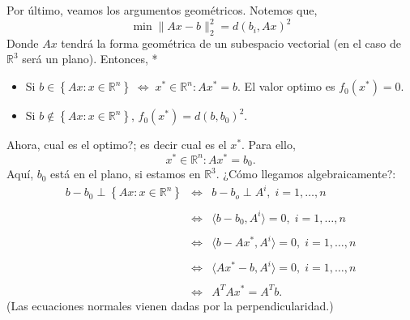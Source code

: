 \begin{paracol}{2}
\begin{ejem}
Por último, veamos los argumentos geométricos. Notemos que,
$$\min \|Ax-b\|^2_2 = d(b_i,Ax)^2$$
Donde $Ax$ tendrá la forma geométrica de un subespacio vectorial (en el caso de $\mathbb{R}^3$ será un plano). Entonces,
\switchcolumn[1]*{\noindent
\begin{center}
\end{center}
}
\switchcolumn[0]\noindent
    \begin{itemize}
	\item Si $b\in \left\{Ax:x\in \mathbb{R}^n\right\}\; \Leftrightarrow \; x^* \in \mathbb{R}^n : Ax^* =b.$ El valor optimo es $f_0(x^*)=0$.
	\item Si $b\notin \left\{Ax:x\in \mathbb{R}^n\right\}$, $f_0(x^*)=d(b,b_0)^2$.
    \end{itemize}
Ahora, cual es el optimo?; es decir cual es el $x^*$. Para ello, 
$$x^*\in \mathbb{R}^n : Ax^*=b_0.$$ Aquí, $b_0$ está en el plano, si estamos en $\mathbb{R}^3$. ¿Cómo llegamos algebraicamente?:
$$
\begin{array}{rcl}
b-b_0 \perp \left\{Ax:x\in \mathbb{R}^n\right\}&\Leftrightarrow & b-b_o \perp A^i,\; i=1,\ldots,n\\\\  
						 &\Leftrightarrow & \langle b-b_0,A^i\rangle=0,\; i=1,\ldots,n\\\\
							   &\Leftrightarrow& \langle b-Ax^*,A^i\rangle = 0, \; i=1,\ldots,n\\\\
							   &\Leftrightarrow& \langle Ax^*-b,A^i\rangle = 0, \; i=1,\ldots,n\\\\
								   &\Leftrightarrow&A^TAx^*=A^Tb.
\end{array}
$$
(Las ecuaciones normales vienen dadas por la perpendicularidad.)
\end{ejem}

\end{paracol}



